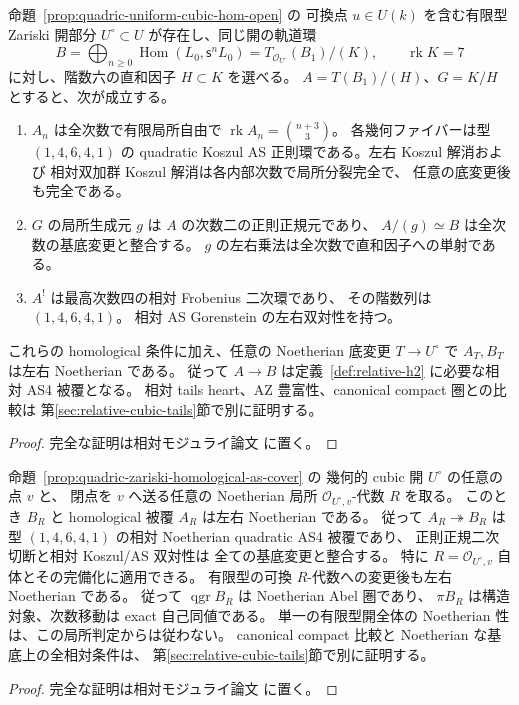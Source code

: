 \begin{proposition}[可換点の有限型近傍での相対 AS4 被覆]
\label{prop:quadric-zariski-homological-as-cover}
命題~\ref{prop:quadric-uniform-cubic-hom-open} の
可換点 $u\in U(k)$ を含む有限型 Zariski 開部分
$U^\circ\subset U$ が存在し、同じ開の軌道環
\[
 B=\bigoplus_{n\ge0}\operatorname{Hom}
       (L_0,\mathsf s^nL_0)
       =T_{\mathcal O_{U^\circ}}(B_1)/(K),
 \qquad \operatorname{rk}K=7
\]
に対し、階数六の直和因子 $H\subset K$ を選べる。
$A=T(B_1)/(H)$、$G=K/H$ とすると、次が成立する。
\begin{enumerate}
\item $A_n$ は全次数で有限局所自由で
  $\operatorname{rk}A_n=\binom{n+3}{3}$。
  各幾何ファイバーは型 $(1,4,6,4,1)$ の quadratic
  Koszul AS 正則環である。左右 Koszul 解消および
  相対双加群 Koszul 解消は各内部次数で局所分裂完全で、
  任意の底変更後も完全である。
\item $G$ の局所生成元 $g$ は $A$ の次数二の正則正規元であり、
  $A/(g)\simeq B$ は全次数の基底変更と整合する。
  $g$ の左右乗法は全次数で直和因子への単射である。
\item $A^!$ は最高次数四の相対 Frobenius 二次環であり、
  その階数列は $(1,4,6,4,1)$。
  相対 AS Gorenstein の左右双対性を持つ。
\end{enumerate}
これらの homological 条件に加え、任意の Noetherian 底変更
$T\to U^\circ$ で $A_T,B_T$ は左右 Noetherian である。
従って $A\to B$ は定義~\ref{def:relative-h2} に必要な相対 AS4 被覆となる。
相対 tails heart、AZ 豊富性、canonical compact 圏との比較は
第\ref{sec:relative-cubic-tails}節で別に証明する。
\end{proposition}
\begin{proof}
完全な証明は相対モジュライ論文 \cite[\texttt{artin_roots}]{QuadricModuli2026} に置く。
\end{proof}


\begin{corollary}
\label{cor:quadric-point-local-noetherian-as4}
命題~\ref{prop:quadric-zariski-homological-as-cover} の
幾何的 cubic 開 $U^\circ$ の任意の点 $v$ と、
閉点を $v$ へ送る任意の Noetherian 局所
$\mathcal O_{U^\circ,v}$-代数 $R$ を取る。
このとき $B_R$ と homological 被覆 $A_R$ は左右 Noetherian である。
従って $A_R\twoheadrightarrow B_R$ は
型 $(1,4,6,4,1)$ の相対 Noetherian quadratic AS4 被覆であり、
正則正規二次切断と相対 Koszul/AS 双対性は
全ての基底変更と整合する。
特に $R=\mathcal O_{U^\circ,v}$ 自体とその完備化に適用できる。
有限型の可換 $R$-代数への変更後も左右 Noetherian である。
従って $\operatorname{qgr}B_R$ は Noetherian Abel 圏であり、
$\pi B_R$ は構造対象、次数移動は exact 自己同値である。
単一の有限型開全体の Noetherian 性は、この局所判定からは従わない。
canonical compact 比較と Noetherian な基底上の全相対条件は、
第\ref{sec:relative-cubic-tails}節で別に証明する。
\end{corollary}
\begin{proof}
完全な証明は相対モジュライ論文 \cite[\texttt{artin_roots}]{QuadricModuli2026} に置く。
\end{proof}




